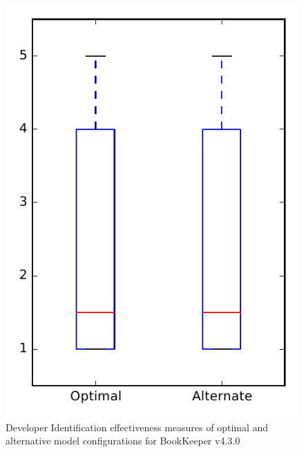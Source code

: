 
\begin{figure}
\centering
\includegraphics[height=0.4\textheight]{figures/combo/dit_rq1_bookkeeper}
\caption{Developer Identification effectiveness measures of optimal and alternative model configurations for BookKeeper v4.3.0}
\label{fig:combo:dit:rq1:bookkeeper}
\end{figure}
